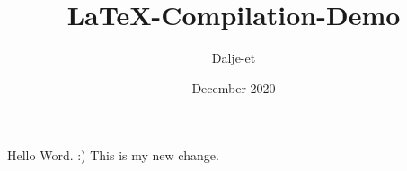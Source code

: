 \documentclass{article}
\title{LaTeX-Compilation-Demo}
\author{Dalje-et}
\date{December 2020}
\begin{document}
\maketitle

Hello Word. :) This is my new change.
\end{document}

